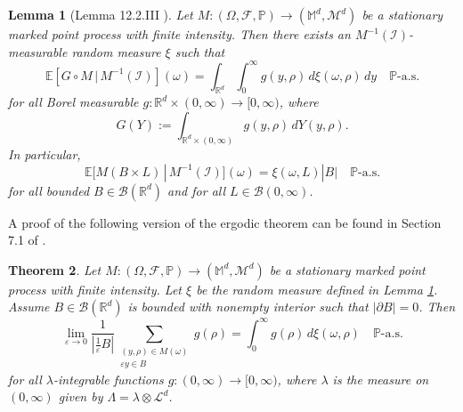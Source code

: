 \documentclass{article}
\numberwithin{equation}{section}
\newtheorem{theorem}{Theorem}[section]
\newtheorem{lemma}[theorem]{Lemma}
\theoremstyle{definition}
\theoremstyle{remark}
\begin{document}
\begin{lemma}[Lemma 12.2.III \cite{DVJ}] \label{lm:conditional_expectation_random_measure}
    Let $M : (\Omega, \mathcal{F}, \mathbb{P}) \rightarrow (\mathbb{M}^d, \mathcal{M}^d)$ be a stationary marked point process with finite intensity. Then there exists an $M^{-1}(\mathcal{I})$-measurable random measure $\xi$ such that 
    \begin{equation} \label{eq:conditional_expectation_integral_representation}
        \mathbb{E}[G \circ M \,|\, M^{-1} (\mathcal{I})](\omega) = \int_{\mathbb{R}^d} \int_0^\infty g(y, \rho) \, d\xi(\omega, \rho) \, dy \quad \mathbb{P}\text{-a.s.}
    \end{equation}
    for all Borel measurable $g : \mathbb{R}^d \times (0, \infty) \rightarrow [0, \infty)$, where
    \[
    G(Y) := \int_{\mathbb{R}^d \times (0, \infty)} g(y, \rho) \, dY(y, \rho).
    \]
    In particular,
    \begin{equation} \label{eq:conditional_expectation_measure_representation}
        \mathbb{E}[M(B \times L) \,|\, M^{-1}(\mathcal{I})](\omega) = \xi(\omega, L) |B| \quad \mathbb{P}\text{-a.s.}
    \end{equation}
    for all bounded $B \in \mathcal{B}(\mathbb{R}^d)$ and for all $L \in \mathcal{B}(0, \infty)$.
\end{lemma}

A proof of the following version of the ergodic theorem can be found in Section 7.1 of \cite{B}.

\begin{theorem} \label{thm:ergodic_theorem_second_version}
    Let $M : (\Omega, \mathcal{F}, \mathbb{P}) \rightarrow (\mathbb{M}^d, \mathcal{M}^d)$ be a stationary marked point process with finite intensity. Let $\xi$ be the random measure defined in Lemma \ref{lm:conditional_expectation_random_measure}. Assume $B \in \mathcal{B}(\mathbb{R}^d)$ is bounded with nonempty interior such that $|\partial B| = 0$. Then
    \begin{equation} \label{eq:ergodic_theorem_second_version}
        \lim_{\varepsilon \to 0} \frac{1}{\left|\frac{1}{\varepsilon} B\right|} \sum \limits_{\substack{(y, \rho) \in M(\omega) \\ \varepsilon y \in B}} g(\rho) = \int_0^\infty g(\rho) \, d\xi(\omega, \rho) \quad \mathbb{P}\text{-a.s.}
    \end{equation}
    for all $\lambda$-integrable functions $g : (0, \infty) \rightarrow [0, \infty)$, where $\lambda$ is the measure on $(0, \infty)$ given by $\Lambda = \lambda \otimes \mathcal{L}^d$.
\end{theorem}
\end{document}
